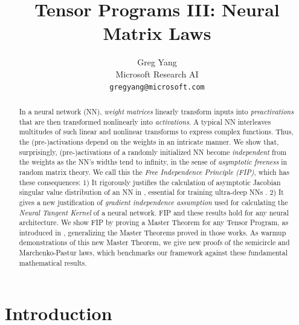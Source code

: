 \documentclass{article}
\title{Tensor Programs III:
Neural Matrix Laws}
\author{%
  Greg Yang\\
  Microsoft Research AI\\
  \texttt{gregyang@microsoft.com} \\
}
\theoremstyle{definition}
\theoremstyle{remark}
\begin{document}
\maketitle

\begin{abstract}
In a neural network (NN), \emph{weight matrices} linearly transform inputs into \emph{preactivations} that are then transformed nonlinearly into \emph{activations}.
A typical NN interleaves multitudes of such linear and nonlinear transforms to express complex functions.
Thus, the (pre-)activations depend on the weights in an intricate manner.
We show that, surprisingly, (pre-)activations of a randomly initialized NN become \emph{independent} from the weights as the NN's widths tend to infinity, in the sense of \emph{asymptotic freeness} in random matrix theory.
We call this the \emph{Free Independence Principle (FIP)}, which has these consequences:
1) It rigorously justifies the calculation of asymptotic Jacobian singular value distribution of an NN in \citet{pennington_resurrecting_2017,pennington_emergence_2018}, essential for training ultra-deep NNs \citep{xiao_dynamical_2018}.
2) It gives a new justification of \emph{gradient independence assumption} used for calculating the \emph{Neural Tangent Kernel} of a neural network.
FIP and these results hold for any neural architecture.
We show FIP by proving a Master Theorem for any Tensor Program, as introduced in \citet{yangTP1,yangTP2}, generalizing the Master Theorems proved in those works.
As warmup demonstrations of this new Master Theorem, we give new proofs of the semicircle and Marchenko-Pastur laws, which benchmarks our framework against these fundamental mathematical results.
\end{abstract}

\section{Introduction}
\end{document}
